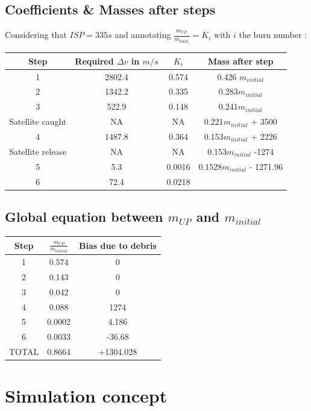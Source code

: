 \subsection{Coefficients \& Masses after steps}

Considering that \(ISP = 335s\) and annotating
\(\frac{m_{UP_i}}{m_{total_i}} = K_i\) with \(i\) the burn number :

\begin{longtable}[]{@{}cccc@{}}
\toprule
Step & Required \(\Delta v\) in \(m/s\) & \(K_i\) & Mass after
step\tabularnewline
\midrule
\endhead
1 & 2802.4 & 0.574 & 0.426 \(m_{initial}\)\tabularnewline
2 & 1342.2 & 0.335 & 0.283\(m_{initial}\)\tabularnewline
3 & 522.9 & 0.148 & 0.241\(m_{initial}\)\tabularnewline
Satellite caught & NA & NA & 0.221\(m_{initial}\) + 3500\tabularnewline
4 & 1487.8 & 0.364 & 0.153\(m_{initial}\) + 2226\tabularnewline
Satellite release & NA & NA & 0.153\(m_{initial}\) -1274\tabularnewline
5 & 5.3 & 0.0016 & 0.1528\(m_{initial}\) - 1271.96\tabularnewline
6 & 72.4 & 0.0218 &\tabularnewline
\bottomrule
\end{longtable}

\hypertarget{header-n470}{%
\subsection{\texorpdfstring{Global equation between \(m_{UP}\) and
		\(m_{initial}\)}{Global equation between m\_\{UP\} and m\_\{initial\}}}\label{header-n470}}



\begin{longtable}[]{@{}ccc@{}}
\toprule
Step & \(\frac{m_{UP}}{m_{initial}}\) & Bias due to
debris\tabularnewline
\midrule
\endhead
1 & 0.574 & 0\tabularnewline
2 & 0.143 & 0\tabularnewline
3 & 0.042 & 0\tabularnewline
4 & 0.088 & 1274\tabularnewline
5 & 0.0002 & 4.186\tabularnewline
6 & 0.0033 & -36.68\tabularnewline
TOTAL & 0.8664 & +1304.028\tabularnewline
\bottomrule
\end{longtable}
\section{Simulation concept}
